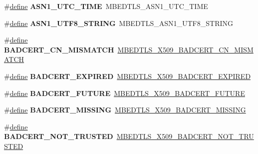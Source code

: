 \begin{DoxyCompactItemize}
\#\hyperlink{structdefine}{define} {\bfseries A\+S\+N1\+\_\+\+U\+T\+C\+\_\+\+T\+I\+ME}~M\+B\+E\+D\+T\+L\+S\+\_\+\+A\+S\+N1\+\_\+\+U\+T\+C\+\_\+\+T\+I\+ME
\item 
\mbox{\label{compat-1_83_8h_a0dcba566de60f1776d36931ac1733b8d}} 
\#\hyperlink{structdefine}{define} {\bfseries A\+S\+N1\+\_\+\+U\+T\+F8\+\_\+\+S\+T\+R\+I\+NG}~M\+B\+E\+D\+T\+L\+S\+\_\+\+A\+S\+N1\+\_\+\+U\+T\+F8\+\_\+\+S\+T\+R\+I\+NG
\item 
\mbox{\label{compat-1_83_8h_acfafc04b8cd60bd1819cf41bc78a24de}} 
\#\hyperlink{structdefine}{define} {\bfseries B\+A\+D\+C\+E\+R\+T\+\_\+\+C\+N\+\_\+\+M\+I\+S\+M\+A\+T\+CH}~\hyperlink{group__x509__module_ga6e71468985ebf243ca7cfce5c3dea881}{M\+B\+E\+D\+T\+L\+S\+\_\+\+X509\+\_\+\+B\+A\+D\+C\+E\+R\+T\+\_\+\+C\+N\+\_\+\+M\+I\+S\+M\+A\+T\+CH}
\item 
\mbox{\label{compat-1_83_8h_a64e936014215ef18f026ff101b6f8369}} 
\#\hyperlink{structdefine}{define} {\bfseries B\+A\+D\+C\+E\+R\+T\+\_\+\+E\+X\+P\+I\+R\+ED}~\hyperlink{group__x509__module_ga5f03158dcacc5914872e38c68231b642}{M\+B\+E\+D\+T\+L\+S\+\_\+\+X509\+\_\+\+B\+A\+D\+C\+E\+R\+T\+\_\+\+E\+X\+P\+I\+R\+ED}
\item 
\mbox{\label{compat-1_83_8h_a277aa22d31ad26e5256ec96e589bd5b9}} 
\#\hyperlink{structdefine}{define} {\bfseries B\+A\+D\+C\+E\+R\+T\+\_\+\+F\+U\+T\+U\+RE}~\hyperlink{group__x509__module_gac769acbb18e53198ae2d2e63bd339cfa}{M\+B\+E\+D\+T\+L\+S\+\_\+\+X509\+\_\+\+B\+A\+D\+C\+E\+R\+T\+\_\+\+F\+U\+T\+U\+RE}
\item 
\mbox{\label{compat-1_83_8h_a99f857088210c1d15a11039026830a0d}} 
\#\hyperlink{structdefine}{define} {\bfseries B\+A\+D\+C\+E\+R\+T\+\_\+\+M\+I\+S\+S\+I\+NG}~\hyperlink{group__x509__module_ga8bca03e3c2c89460bea17ab142b0b7ab}{M\+B\+E\+D\+T\+L\+S\+\_\+\+X509\+\_\+\+B\+A\+D\+C\+E\+R\+T\+\_\+\+M\+I\+S\+S\+I\+NG}
\item 
\mbox{\label{compat-1_83_8h_a71c9686585580f77964a3653e147ad0a}} 
\#\hyperlink{structdefine}{define} {\bfseries B\+A\+D\+C\+E\+R\+T\+\_\+\+N\+O\+T\+\_\+\+T\+R\+U\+S\+T\+ED}~\hyperlink{group__x509__module_ga0e5b1d4c9c1a1a3227238c82042c1d1b}{M\+B\+E\+D\+T\+L\+S\+\_\+\+X509\+\_\+\+B\+A\+D\+C\+E\+R\+T\+\_\+\+N\+O\+T\+\_\+\+T\+R\+U\+S\+T\+ED}

\end{DoxyCompactItemize}
